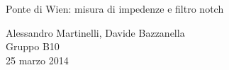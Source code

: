 \begin{center}

     	{\huge Ponte di Wien: misura di impedenze e filtro notch}

     	\vspace{0.2cm}
	\vspace{0.3cm}

      	{\large Alessandro Martinelli, Davide Bazzanella} \\
		{ Gruppo B10} \\
	
	\vspace{0.1cm}
      	{ 25 marzo 2014}

\end{center}
